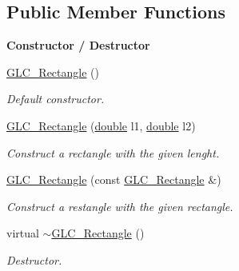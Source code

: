 \subsection*{Public Member Functions}
\begin{Indent}{\bf Constructor / Destructor}\par
\begin{DoxyCompactItemize}
\item 
\hyperlink{class_g_l_c___rectangle_a647c694eb778cf1bc5a82dcb345c05ec}{G\-L\-C\-\_\-\-Rectangle} ()
\begin{DoxyCompactList}\small\item\em Default constructor. \end{DoxyCompactList}\item 
\hyperlink{class_g_l_c___rectangle_a9d44140bb140db0030fa2e9b5ccbebfc}{G\-L\-C\-\_\-\-Rectangle} (\hyperlink{_super_l_u_support_8h_a8956b2b9f49bf918deed98379d159ca7}{double} l1, \hyperlink{_super_l_u_support_8h_a8956b2b9f49bf918deed98379d159ca7}{double} l2)
\begin{DoxyCompactList}\small\item\em Construct a rectangle with the given lenght. \end{DoxyCompactList}\item 
\hyperlink{class_g_l_c___rectangle_a36d307637bb87b8b57a8639a64e8ac67}{G\-L\-C\-\_\-\-Rectangle} (const \hyperlink{class_g_l_c___rectangle}{G\-L\-C\-\_\-\-Rectangle} \&)
\begin{DoxyCompactList}\small\item\em Construct a restangle with the given rectangle. \end{DoxyCompactList}\item 
virtual \hyperlink{class_g_l_c___rectangle_a9d4babf5cc56a4cc0688238ead67c8c4}{$\sim$\-G\-L\-C\-\_\-\-Rectangle} ()
\begin{DoxyCompactList}\small\item\em Destructor. \end{DoxyCompactList}\end{DoxyCompactItemize}
\end{Indent}
